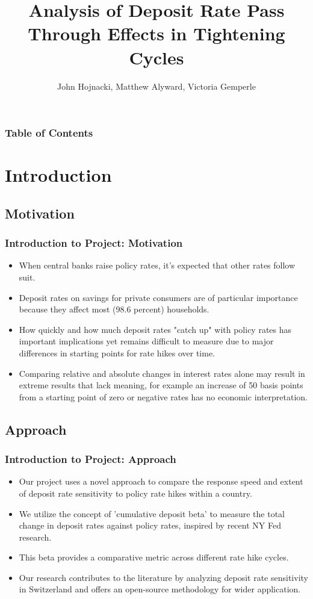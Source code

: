 \documentclass{beamer}
\title{Analysis of Deposit Rate Pass Through Effects in Tightening Cycles}
\institute{University of Zurich}
\author{John Hojnacki, Matthew Alyward, Victoria Gemperle}
\begin{document}
\begin{frame}
\titlepage %
\end{frame}

\begin{frame}
\frametitle{Table of Contents}
\tableofcontents
\end{frame}

\section{Introduction}
\subsection{Motivation}
\begin{frame}
\frametitle{Introduction to Project: Motivation}
\begin{itemize}
  \item When central banks raise policy rates, it's expected that other rates follow suit.
  \item Deposit rates on savings for private consumers are of particular importance because they affect most (98.6 percent) households\cite{scf2022}.
  \item How quickly and how much deposit rates "catch up" with policy rates has important implications yet remains difficult to measure due to major differences in starting points for rate hikes over time.
  \item Comparing relative and absolute changes in interest rates alone may result in extreme results that lack meaning, for example an increase of 50 basis points from a starting point of zero or negative rates has no economic interpretation.
\end{itemize}
\end{frame}

\subsection{Approach}
\begin{frame}
\frametitle{Introduction to Project: Approach}
\begin{itemize}
  \item Our project uses a novel approach to compare the response speed and extent of deposit rate sensitivity to policy rate hikes within a country.
  \item We utilize the concept of 'cumulative deposit beta' to measure the total change in deposit rates against policy rates, inspired by recent NY Fed research\cite{deposit2023}. 
  \item This beta provides a comparative metric across different rate hike cycles.
  \item Our research contributes to the literature by analyzing deposit rate sensitivity in Switzerland and offers an open-source methodology for wider application.
\end{itemize}
\end{frame}
\end{document}
